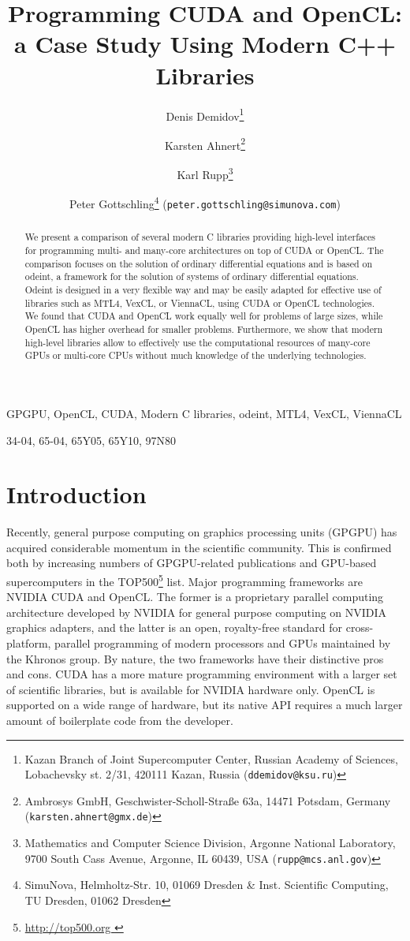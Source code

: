 \documentclass[final]{siamltex}
\title{Programming CUDA and OpenCL:\\a Case Study Using Modern C++ Libraries}
\author{
Denis Demidov\thanks{
Kazan Branch of Joint Supercomputer Center,
Russian Academy of Sciences,
Lobachevsky st. 2/31, 420111 Kazan, Russia
({\tt ddemidov@ksu.ru}) }
\and Karsten Ahnert\thanks{Ambrosys GmbH, Geschwister-Scholl-Stra\ss e 63a, 14471 Potsdam, Germany ({\tt karsten.ahnert@gmx.de}) }
\and Karl Rupp\thanks{Mathematics and Computer Science Division,
Argonne National Laboratory,
9700 South Cass Avenue, Argonne, IL 60439, USA
({\tt rupp@mcs.anl.gov}) }
\and Peter Gottschling\thanks{SimuNova, Helmholtz-Str. 10, 01069 Dresden \&
Inst. Scientific Computing, TU Dresden, 01062 Dresden}
({\tt peter.gottschling@simunova.com}) }
\newcommand{\addpp}[1]{{#1\nolinebreak[4]\hspace{-.05em}\raisebox{.4ex}{\tiny\bf ++}}\xspace}
\newcommand{\Cpp}{\addpp{C}}
\begin{document}
\maketitle

\begin{abstract}
    We present a comparison of several modern \Cpp libraries providing high-level interfaces
    for programming multi- and many-core architectures on top of CUDA or OpenCL.
    The comparison focuses on the solution of ordinary differential equations and is based on odeint,
    a framework for the solution of systems of ordinary differential equations. Odeint is designed in a
    very flexible way and may be easily adapted for effective use of libraries such
    as MTL4, VexCL, or ViennaCL, using CUDA or OpenCL technologies.
    We found that CUDA and OpenCL work equally well for problems
    of large sizes, while OpenCL has higher overhead for smaller problems.
    Furthermore, we show that modern high-level libraries allow to effectively
    use the computational resources of many-core GPUs or multi-core CPUs without much
    knowledge of the underlying technologies.
\end{abstract}

\begin{keywords}
    GPGPU, OpenCL, CUDA, Modern \Cpp libraries, odeint, MTL4, VexCL, ViennaCL
\end{keywords}

\begin{AMS}
    34-04, 65-04, 65Y05, 65Y10, 97N80
\end{AMS}


%
%
\section{Introduction}

\pagestyle{myheadings}

\thispagestyle{plain}


Recently, general purpose computing on graphics processing units (GPGPU) has
acquired considerable momentum in the scientific community. This is confirmed
both by increasing numbers of GPGPU-related publications and GPU-based
supercomputers in the TOP500\footnote{ \href{ http://top500.org }{
http://top500.org }} list. Major programming frameworks are NVIDIA CUDA and
OpenCL.
The former is a proprietary parallel computing architecture developed
by NVIDIA for general purpose computing on NVIDIA graphics adapters, and the
latter is an open, royalty-free standard for cross-platform, parallel
programming of modern processors and GPUs maintained by the Khronos group. By
nature, the two frameworks have their distinctive pros and cons. CUDA has a
more mature programming environment with a larger set of scientific libraries,
but is available for NVIDIA hardware only. OpenCL is supported on a wide range
of hardware, but its native API requires a much larger amount of boilerplate
code from the developer.
\end{document}
